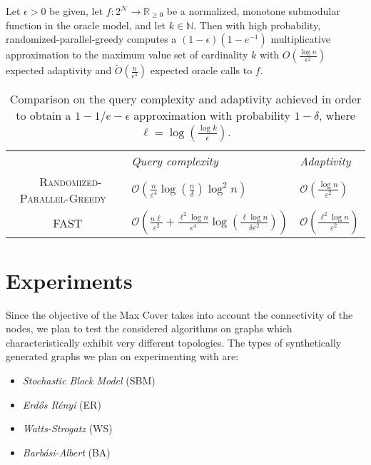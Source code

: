 \documentclass[11pt, a4paper]{article}
\begin{document}
\begin{theorem}
Let $\epsilon>0$ be given, let $f: 2^{\mathcal{N}} \rightarrow \mathbb{R}_{\geq 0}$ be a normalized, monotone submodular function in the oracle model, and let $k \in \mathbb{N}$. Then with high probability, randomized-parallel-greedy computes a $(1-\epsilon)\left(1-e^{-1}\right)$ multiplicative approximation to the maximum value set of cardinality $k$ with $O\left(\frac{\log n}{\epsilon^{2}}\right)$ expected adaptivity and $\tilde{O}\left(\frac{n}{\epsilon^{4}}\right)$ expected oracle calls to $f$.
\end{theorem}

\begin{table}[h]
\begin{center}
\begin{tabular}{cll}\vspace{0.2cm}
        & \emph{Query complexity} & \emph{Adaptivity} &   \\\ \vspace{0.3cm}
 \textsc{Randomized-Parallel-Greedy}~\cite{chekuri2018submodular}& $\mathcal{O}\left(  \frac{n}{\varepsilon^4}  \log\left(\frac{n}{\delta}\right) \log^2 n\right)  $ & $ \mathcal{O}\left(\frac{\log n}{\varepsilon^2}  \right)$ & \\\ \vspace{0.3cm}
  \textsc{FAST}~\cite{breuer2019fast} &     $\mathcal{O}\left(\frac{  n \ell}{\varepsilon^2} +  \frac{ \ell^2 \log n}{\epsilon^4}   \log(\frac{\ell\log n}{\delta \varepsilon^2})\right)$        &   $\mathcal{O}\left(\frac{ \ell^2 \log n}{\varepsilon^2}\right)$   & 
\end{tabular}
  \caption{Comparison on the query complexity and adaptivity achieved in order to obtain a $1-1/e-\epsilon$ approximation with probability $1 - \delta$, where  $\ell = \log(\frac{\log k}{\epsilon})$.  }
  \label{tab:queries}
\end{center}
\end{table}


\section{Experiments}

Since the objective of the Max Cover takes into account the connectivity of the nodes, we plan to test the considered algorithms on graphs which characteristically exhibit very different topologies. The types of synthetically generated graphs we plan on experimenting with are:
\begin{itemize}
    \item \emph{Stochastic Block Model} (SBM)
    \item \emph{Erd\H{o}s R\'{e}nyi} (ER)
    \item \emph{Watts-Strogatz} (WS)
    \item \emph{Barb\'{a}si-Albert} (BA)
\end{itemize}
\end{document}
